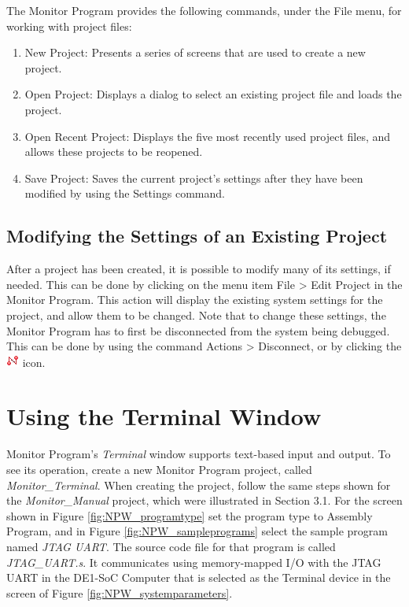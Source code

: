 \documentclass[11pt, twoside, pdftex]{article}
\begin{document}
The Monitor Program provides the following commands, under the
{\sf File} menu, for working with project files:

\begin{enumerate}
    \item {\sf New Project}: Presents a series of screens that are used to create a new project.
    \item {\sf Open Project}: Displays a dialog to select an
existing project file and loads the project.
    \item {\sf Open Recent Project}:  Displays the five most recently used project files, and allows these projects to be
reopened.
    \item {\sf Save Project}: Saves the current project's
settings after they have been modified by using 
the {\sf Settings} command.
\end{enumerate}

\subsection{Modifying the Settings of an Existing Project}

After a project has been created, it is possible to modify many
of its settings, if needed. This can be done by clicking
on the menu item {\sf File > Edit Project} in the Monitor
Program. This action will display the existing system settings for the
project, and allow them to be changed. Note that to change
these settings, the Monitor Program has to first be disconnected
from the system being debugged. This can be done by using the
command {\sf Actions > Disconnect}, or by clicking the
\includegraphics{toolbar/disconnect.png} icon.

\newpage
\section{Using the Terminal Window}

Monitor Program's \emph{Terminal} window supports
text-based input and output. To see its operation, create
a new Monitor Program project, called {\it Monitor\_Terminal}.
When creating the project, follow the same steps shown for the
{\it Monitor\_Manual} project, which were illustrated in 
Section 3.1. For the screen shown in Figure \ref{fig:NPW_programtype} set the program
type to {\sf Assembly Program}, and in Figure \ref{fig:NPW_sampleprograms} select the
sample program named {\it JTAG UART}. The source code file for
that program is called {\it JTAG\_UART.s}.  It communicates using
memory-mapped I/O with the JTAG UART in the DE1-SoC Computer that
is selected as the {\sf Terminal device} in the screen of 
Figure \ref{fig:NPW_systemparameters}. 
\end{document}
